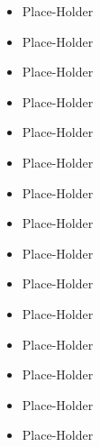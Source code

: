 \begin{itemize}
    \item Place-Holder
    \item Place-Holder
\end{itemize}
\smallskip
{}
\begin{itemize}
    \item Place-Holder
    \item Place-Holder
    \item Place-Holder
\end{itemize}
\smallskip
{}
\begin{itemize}
    \item Place-Holder
    \item Place-Holder
    \item Place-Holder
    \item Place-Holder
\end{itemize}
\smallskip
{}
\begin{itemize}
    \item Place-Holder
    \item Place-Holder
\end{itemize}
\smallskip
{}
\begin{itemize}
    \item Place-Holder
    \item Place-Holder
\end{itemize}

\begin{itemize}
    \item Place-Holder
    \item Place-Holder
\end{itemize}
\smallskip

